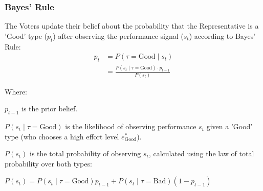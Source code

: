 \documentclass[10pt]{beamer}
\begin{document}
\begin{frame}
  \label{slide:bayes}
  \frametitle{\large Bayes' Rule}
  The Voters update their belief about the probability that the Representative is a 'Good' type ($p_t$) after observing the performance signal ($s_t$) according to Bayes' Rule:
  {\large
    \begin{align*}
      p_t &= P(\tau=\text{Good} \mid s_t) \\
        &= \frac{ P(s_t \mid \tau=\text{Good}) \cdot p_{t-1} }{ P(s_t) }
    \end{align*}
  }
    \begin{block}{Where:}
      \begin{itemize}
        {\small
          \item $p_{t-1}$ is the prior belief.
          
          \item $P(s_t \mid \tau=\text{Good})$ is the likelihood of observing performance $s_t$ given a 'Good' type (who chooses a high effort level $e^*_{\text{Good}}$).
          
          \item $P(s_t)$ is the total probability of observing $s_t$, calculated using the law of total probability over both types:
          \begin{center}
          $P(s_t) = P(s_t \mid \tau=\text{Good})p_{t-1} + P(s_t \mid \tau=\text{Bad})(1-p_{t-1})$
          \end{center}}
      \end{itemize}
    \end{block}
\hyperlink{slide:equilibrium}{} 
\end{frame}
\end{document}
